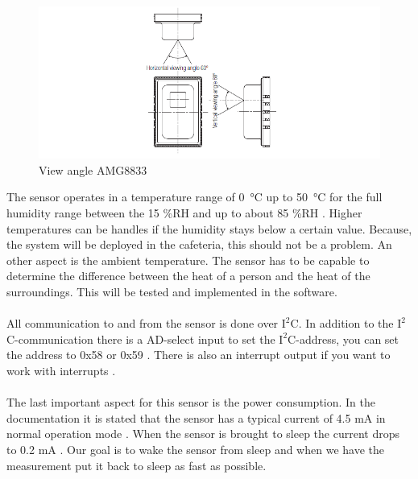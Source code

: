\documentclass[11pt,a4paper]{article}
\begin{document}
\begin{figure}[H]
	\centering
	\includegraphics[width=1\linewidth]{view_angle_AMG8833.png}
	\caption{View angle AMG8833 \cite{bib:AMG8833}}
	\label{fig:angleview}
\end{figure}
The sensor operates in a temperature range of \SI{0}{\celsius} up to \SI{50}{\celsius} for the full humidity range between the 15 \%RH and up to about 85 \%RH \cite{bib:AMG8833} . Higher temperatures can be handles if the humidity stays below a certain value. Because, the system will be deployed in the cafeteria, this should not be a problem. An other aspect is the ambient temperature. The sensor has to be capable to determine the difference between the heat of a person and the heat of the surroundings. This will be tested and implemented in the software. 
\\ \\
All communication to and from the sensor is done over $\text{I}^2$C. In addition to the $\text{I}^2$C-communication there is a AD-select input to set the $\text{I}^2$C-address, you can set the address to 0x58 or 0x59 \cite{bib:AMG8833} . There is also an interrupt output if you want to work with interrupts \cite{bib:AMG8833}. 
\\ \\
The last important aspect for this sensor is the power consumption. In the documentation it is stated that the sensor has a typical current of 4.5 mA in normal operation mode \cite{bib:AMG8833} . When the sensor is brought to sleep the current drops to 0.2 mA \cite{bib:AMG8833} . Our goal is to wake the sensor from sleep and when we have the measurement put it back to sleep as fast as possible.
\end{document}
